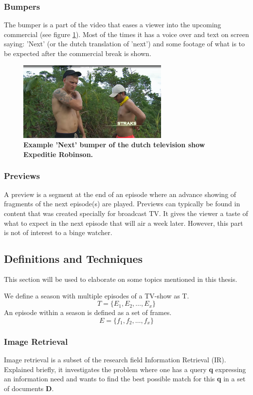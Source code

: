 \documentclass{article}
\begin{document}
\subsubsection{Bumpers}
The bumper is a part of the video that eases a viewer into the upcoming commercial (see figure \ref{examplebumper}). Most of the times it has a voice over and text on screen saying: 'Next' (or the dutch translation of 'next') and some footage of what is to be expected after the commercial break is shown.

\begin{figure}[H]
    \includegraphics[width=7.5cm]{images/straks.png}
    \centering
    \caption{\textbf{Example 'Next' bumper of the dutch television show Expeditie Robinson.}}
    \label{examplebumper}
\end{figure}

\subsubsection{Previews}
A preview is a segment at the end of an episode where an advance showing of fragments of the next episode(s) are played. Previews can typically be found in content that was created specially for broadcast TV. It gives the viewer a taste of what to expect in the next episode that will air a week later. However, this part is not of interest to a binge watcher.

\subsection{Definitions and Techniques}
This section will be used to elaborate on some topics mentioned in this thesis.

We define a season with multiple episodes of a TV-show as T.
\[T = \{E_1, E_2, \dots, E_x\}\]
An episode within a season is defined as a set of frames.
\[E = \{f_1, f_2, \dots, f_x\}\]


\subsubsection{Image Retrieval}
Image retrieval is a subset of the research field Information Retrieval (IR). Explained briefly, it investigates the problem where one has a query \textbf{q} expressing an information need and wants to find the best possible match for this \textbf{q} in a set of documents \textbf{D}.
\end{document}
